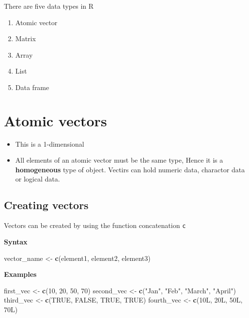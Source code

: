 \documentclass[
]{book}
\newenvironment{Shaded}{\begin{snugshade}}{\end{snugshade}}
\newcommand{\DecValTok}[1]{\textcolor[rgb]{0.00,0.00,0.81}{#1}}
\newcommand{\KeywordTok}[1]{\textcolor[rgb]{0.13,0.29,0.53}{\textbf{#1}}}
\newcommand{\NormalTok}[1]{#1}
\newcommand{\OtherTok}[1]{\textcolor[rgb]{0.56,0.35,0.01}{#1}}
\newcommand{\StringTok}[1]{\textcolor[rgb]{0.31,0.60,0.02}{#1}}
\begin{document}
There are five data types in R

\begin{enumerate}
\def\labelenumi{\arabic{enumi}.}
\item
  Atomic vector
\item
  Matrix
\item
  Array
\item
  List
\item
  Data frame
\end{enumerate}

\hypertarget{atomic-vectors}{%
\section{Atomic vectors}\label{atomic-vectors}}

\begin{itemize}
\item
  This is a 1-dimensional
\item
  All elements of an atomic vector must be the same type, Hence it is a \textbf{homogeneous} type of object. Vectirs can hold numeric data, charactor data or logical data.
\end{itemize}

\hypertarget{creating-vectors}{%
\subsection{Creating vectors}\label{creating-vectors}}

Vectors can be created by using the function concatenation \texttt{c}

\textbf{Syntax}

\begin{Shaded}
\begin{Highlighting}[]
\NormalTok{vector_name <-}\StringTok{ }\KeywordTok{c}\NormalTok{(element1, element2, element3)}
\end{Highlighting}
\end{Shaded}

\textbf{Examples}

\begin{Shaded}
\begin{Highlighting}[]
\NormalTok{first_vec <-}\StringTok{ }\KeywordTok{c}\NormalTok{(}\DecValTok{10}\NormalTok{, }\DecValTok{20}\NormalTok{, }\DecValTok{50}\NormalTok{, }\DecValTok{70}\NormalTok{)}
\NormalTok{second_vec <-}\StringTok{ }\KeywordTok{c}\NormalTok{(}\StringTok{"Jan"}\NormalTok{, }\StringTok{"Feb"}\NormalTok{, }\StringTok{"March"}\NormalTok{, }\StringTok{"April"}\NormalTok{)}
\NormalTok{third_vec <-}\StringTok{ }\KeywordTok{c}\NormalTok{(}\OtherTok{TRUE}\NormalTok{, }\OtherTok{FALSE}\NormalTok{, }\OtherTok{TRUE}\NormalTok{, }\OtherTok{TRUE}\NormalTok{)}
\NormalTok{fourth_vec <-}\StringTok{ }\KeywordTok{c}\NormalTok{(10L, 20L, 50L, 70L)}
\end{Highlighting}
\end{Shaded}
\end{document}
